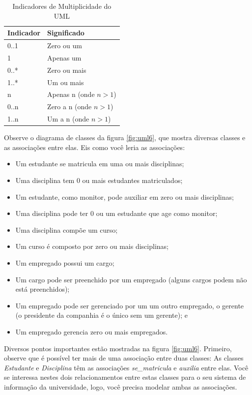 \documentclass[
	11pt,				%
	openright,
	twoside,			%
	a4paper,			%
	english,			%
	french,
	brazil,				%
	sumario=tradicional
	]{abntex2}
\begin{document}
\begin{table}
\caption{Indicadores de Multiplicidade do UML} \label{tab:uml:mult}
\begin{center}
\begin{tabular}{l l}

\textbf{Indicador} & \textbf{Significado} \\
\hline

0..1 & Zero ou um \\
1 & Apenas um \\
0..* & Zero ou mais \\
1..* & Um ou mais \\
n & Apenas n (onde $n>1$) \\
0..n & Zero a n (onde $n>1$) \\
1..n & Um a n (onde $n>1$)\\
\hline

\end{tabular}
\end{center}
\end{table}

Observe o diagrama de classes da figura \ref{fig:uml6}, que mostra diversas classes e as associações entre elas. Eis como você leria as associações:
\begin{itemize}
\item Um estudante se matricula em uma ou mais disciplinas;
\item Uma disciplina tem 0 ou mais estudantes matriculados;
\item Um estudante, como monitor, pode auxiliar em zero ou mais disciplinas;
\item Uma disciplina pode ter 0 ou um estudante que age como monitor;
\item Uma disciplina compõe um curso;
\item Um curso é composto por zero ou mais disciplinas;
\item Um empregado possui um cargo;
\item Um cargo pode ser preenchido por um empregado (alguns cargos podem não está preenchidos);
\item Um empregado pode ser gerenciado por um um outro empregado, o gerente (o presidente da companhia é o único sem um gerente); e
\item Um empregado gerencia zero ou mais empregados.
\end{itemize}

Diversos pontos importantes estão mostradas na figura \ref{fig:uml6}. Primeiro, observe que é possível ter mais de uma associação entre duas classes: As classes \emph{Estudante} e \emph{Disciplina} têm as associações \emph{se\_matricula} e \emph{auxilia} entre elas. Você se interessa nestes dois relacionamentos entre estas classes para o seu sistema de informação da universidade, logo, você precisa modelar ambas as associações.
\end{document}
